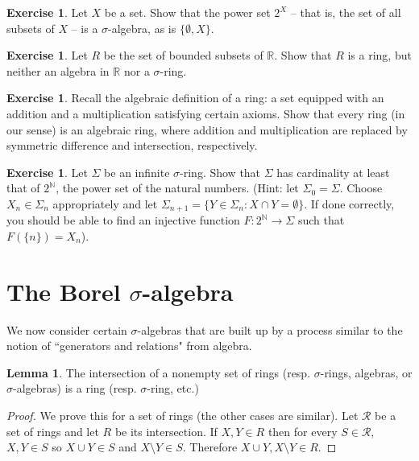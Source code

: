 \documentclass[12pt]{book}
\newcommand{\NN}{\mathbb{N}}
\newcommand{\RR}{\mathbb{R}}
\theoremstyle{definition}
\newtheorem{lemma}[theorem]{Lemma}
\newtheorem{exercise}[theorem]{Exercise}
\begin{document}
\begin{exercise}
Let $X$ be a set.
Show that the power set $2^X$ -- that is, the set of all subsets of $X$ -- is a $\sigma$-algebra, as is $\{\emptyset, X\}$.
\end{exercise}

\begin{exercise}
Let $R$ be the set of bounded subsets of $\RR$.
Show that $R$ is a ring, but neither an algebra in $\RR$ nor a $\sigma$-ring.
\end{exercise}

\begin{exercise}
Recall the algebraic definition of a ring: a set equipped with an addition and a multiplication satisfying certain axioms.
Show that every ring (in our sense) is an algebraic ring, where addition and multiplication are replaced by symmetric difference and intersection, respectively.
\end{exercise}

\begin{exercise}
Let $\Sigma$ be an infinite $\sigma$-ring. Show that $\Sigma$ has cardinality at least that of $2^\NN$, the power set of the natural numbers.
(Hint: let $\Sigma_0 = \Sigma$. Choose $X_n \in \Sigma_n$ appropriately and let $\Sigma_{n+1} = \{Y \in \Sigma_n: X \cap Y = \emptyset\}$. If done correctly, you should be able to find an injective function $F: 2^\NN \to \Sigma$ such that $F(\{n\}) = X_n$).
\end{exercise}

\section{The Borel $\sigma$-algebra}
We now consider certain $\sigma$-algebras that are built up by a process similar to the notion of ``generators and relations" from algebra.

\begin{lemma}
\label{intersection of rings is ring}
The intersection of a nonempty set of rings (resp. $\sigma$-rings, algebras, or $\sigma$-algebras) is a ring (resp. $\sigma$-ring, etc.)
\end{lemma}
\begin{proof}
We prove this for a set of rings (the other cases are similar). Let $\mathcal R$ be a set of rings and let $R$ be its intersection.
If $X, Y \in R$ then for every $S \in \mathcal R$, $X, Y \in S$ so $X \cup Y \in S$ and $X \setminus Y \in S$.
Therefore $X \cup Y, X \setminus Y \in R$.
\end{proof}
\end{document}
